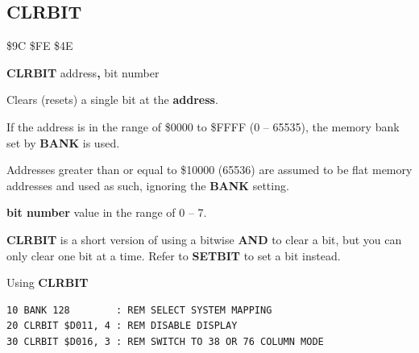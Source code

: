 \subsection{CLRBIT}
\begin{description}[leftmargin=2cm,style=nextline]
\item [Token:]   \$9C \$FE \$4E

\item [Format:]  {\bf CLRBIT} address{\bf,} bit number

\item [Usage:]   Clears (resets) a single bit at the {\bf address}.

                 If the address is in the range of \$0000 to \$FFFF (0 -- 65535), the memory bank set by {\bf BANK} is used.

                 Addresses greater than or equal to \$10000 (65536) are assumed to be flat memory addresses and used as such, ignoring the {\bf BANK} setting.

                 {\bf bit number} value in the range of 0 -- 7.

\item [Remarks:] {\bf CLRBIT} is a short version of using a bitwise {\bf AND} to clear a bit, but you can only clear one bit at a time. Refer to {\bf SETBIT} to set a bit instead.

\item [Example:] Using {\bf CLRBIT}

\begin{tcolorbox}[colback=black,coltext=white]
\verbatimfont{\codefont}
\begin{verbatim}
10 BANK 128        : REM SELECT SYSTEM MAPPING
20 CLRBIT $D011, 4 : REM DISABLE DISPLAY
30 CLRBIT $D016, 3 : REM SWITCH TO 38 OR 76 COLUMN MODE
\end{verbatim}
\end{tcolorbox}
\end{description}


\newpage
